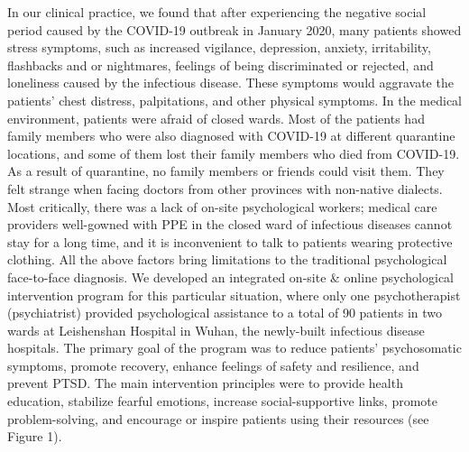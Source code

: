 \documentclass[
]{article}
\begin{document}
In our clinical practice, we found that after experiencing the negative social period caused by the COVID-19 outbreak in January 2020, many patients showed stress symptoms, such as increased vigilance, depression, anxiety, irritability, flashbacks and or nightmares, feelings of being discriminated or rejected, and loneliness caused by the infectious disease. These symptoms would aggravate the patients' chest distress, palpitations, and other physical symptoms. In the medical environment, patients were afraid of closed wards. Most of the patients had family members who were also diagnosed with COVID-19 at different quarantine locations, and some of them lost their family members who died from COVID-19. As a result of quarantine, no family members or friends could visit them. They felt strange when facing doctors from other provinces with non-native dialects. Most critically, there was a lack of on-site psychological workers; medical care providers well-gowned with PPE in the closed ward of infectious diseases cannot stay for a long time, and it is inconvenient to talk to patients wearing protective clothing. All the above factors bring limitations to the traditional psychological face-to-face diagnosis. We developed an integrated on-site & online psychological intervention program for this particular situation, where only one psychotherapist (psychiatrist) provided psychological assistance to a total of 90 patients in two wards at Leishenshan Hospital in Wuhan, the newly-built infectious disease hospitals. The primary goal of the program was to reduce patients' psychosomatic symptoms, promote recovery, enhance feelings of safety and resilience, and prevent PTSD. The main intervention principles were to provide health education, stabilize fearful emotions, increase social-supportive links, promote problem-solving, and encourage or inspire patients using their resources (see Figure 1).
\end{document}
